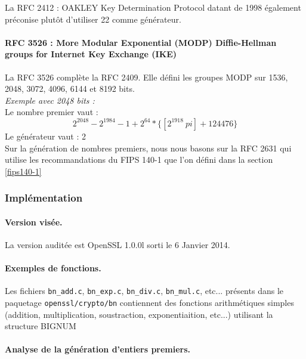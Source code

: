 			La RFC 2412 : OAKLEY Key Determination Protocol datant de 1998 également \cite{rfc2412} préconise plutôt d'utiliser 22 comme générateur.

			\paragraph{RFC 3526 : More Modular Exponential (MODP) Diffie-Hellman groups for Internet Key Exchange (IKE)\\}

			La RFC 3526 \cite{rfc3526} complète la RFC 2409. Elle défini les groupes MODP sur 1536, 2048, 3072, 4096, 6144 et 8192 bits.\\

			\textit{Exemple avec 2048 bits :}\\
			Le nombre premier vaut :
			$$ 2^2048 - 2^1984 - 1 + 2^64 * \{ [2^1918\ pi] + 124476 \} $$
			Le générateur vaut : 2\\

			Sur la génération de nombres premiers, nous nous basons sur la RFC 2631 qui utilise les recommandations du FIPS 140-1 que l'on défini dans la section \ref{fips140-1}


		\subsubsection{Implémentation}
			\paragraph{Version visée. \\}

			La version auditée est OpenSSL 1.0.0l sorti le 6 Janvier 2014.

			\paragraph{Exemples de fonctions. \\}

			Les fichiers \texttt{bn\_add.c}, \texttt{bn\_exp.c}, \texttt{bn\_div.c}, \texttt{bn\_mul.c}, etc... présents dans le paquetage \texttt{openssl/crypto/bn} contiennent des fonctions arithmétiques simples (addition, multiplication, soustraction, exponentiaition, etc...) utilisant la structure BIGNUM

			\paragraph{Analyse de la génération d'entiers premiers.\\}

